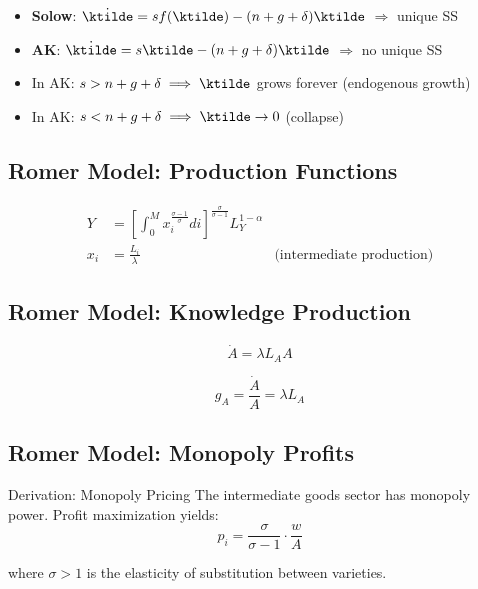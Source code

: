 \begin{tcolorbox}[colback=blue!5,colframe=blue3,title=Key Difference: AK vs Solow]
\begin{itemize}
    \item \textbf{Solow}: $\dot{\ktilde} = sf(\ktilde) - (n+g+\delta)\ktilde$ $\Rightarrow$ unique SS
    \item \textbf{AK}: $\dot{\ktilde} = s\ktilde - (n+g+\delta)\ktilde$ $\Rightarrow$ no unique SS
    \item In AK: $s > n+g+\delta \implies \ktilde$ grows forever (endogenous growth)
    \item In AK: $s < n+g+\delta \implies \ktilde \to 0$ (collapse)
\end{itemize}
\end{tcolorbox}

\medskip
\subsection*{Romer Model: Production Functions}
\begin{align*}
Y &= \left[ \int_0^M x_i^{\frac{\sigma-1}{\sigma}} di \right]^{\frac{\sigma}{\sigma-1}} L_Y^{1-\alpha}
\tag{Final Goods} \\
x_i &= \frac{L_i}{\lambda} \quad &\text{(intermediate production)}
\tag{Intermediate}
\end{align*}

\medskip
\subsection*{Romer Model: Knowledge Production}
\[
\dot{A} = \lambda L_A A
\tag{R\&D}
\]

\begin{resultbox}
\[
\boxed{g_A = \frac{\dot{A}}{A} = \lambda L_A}
\tag{Romer-Growth}
\]
\end{resultbox}

\medskip
\subsection*{Romer Model: Monopoly Profits}
\begin{derivationbox}{Derivation: Monopoly Pricing}
The intermediate goods sector has monopoly power. Profit maximization yields:
\[
p_i = \frac{\sigma}{\sigma-1} \cdot \frac{w}{A}
\tag{Monopoly-Price}
\]

where $\sigma > 1$ is the elasticity of substitution between varieties.
\end{derivationbox}

